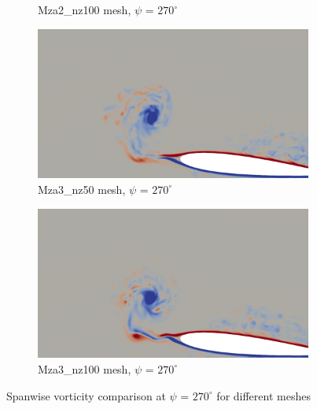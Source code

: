 \begin{figure}[H]
\begin{subfigure}[b]{0.475\textwidth}
		\caption{Mza2\_nz100 mesh, $\psi$ = $270^\circ$}
		\label{fig:Mza2_100_sp_psi270}
	\end{subfigure}
	\begin{subfigure}[b]{0.475\textwidth}
	\centering
	\includegraphics[width=1\textwidth]{figures/zonal_adapt_results/vorticity_plots/v3/Mza3_50/spavg/phase_270.png}
	\caption{Mza3\_nz50 mesh, $\psi$ = $270^\circ$}
	\label{fig:Mza3_50_sp_psi270}
\end{subfigure}
	\begin{subfigure}[b]{0.475\textwidth}
		\centering
		\includegraphics[width=1\textwidth]{figures/zonal_adapt_results/vorticity_plots/v3/Mza3_100/spavg/phase_270.png}
		\caption{Mza3\_nz100 mesh, $\psi$ = $270^\circ$}
		\label{fig:Mza3_100_sp_psi270}
	\end{subfigure}
	\caption{Spanwise vorticity comparison at $\psi$ = $270^\circ$ for different meshes}
	\label{fig:vorticity_zonal_270}
\end{figure}